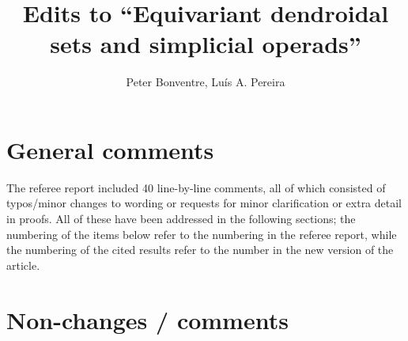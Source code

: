 \documentclass[a4paper,10pt
]{article}%
\title{Edits to ``Equivariant dendroidal sets and simplicial operads''}
\author{Peter Bonventre, Lu\'is A. Pereira}%
\numberwithin{equation}{section}
\numberwithin{figure}{section}
\theoremstyle{definition} %
\newcommand{\1}{\ensuremath{\mathbbm 1}}%
\begin{document}
 
  
\maketitle
 



\section{General comments}

The referee report included 40 line-by-line comments, 
all of which consisted of typos/minor changes to wording
or requests for minor clarification or extra detail in proofs.
All of these have been addressed in the following sections;
the numbering of the items below refer to the numbering in the referee report,
while the numbering of the cited results refer to the number in the new version of the article.

      

\section{Non-changes / comments}
\end{document}

